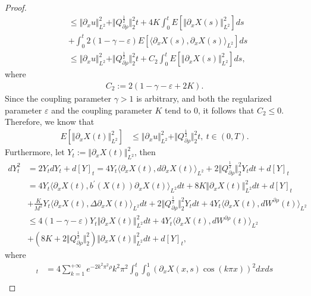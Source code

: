\documentclass[11pt]{article}
\numberwithin{equation}{section}%
\numberwithin{figure}{section}%
\theoremstyle{remark}
\begin{document}
\begin{proof}
\begin{align*}
			&\leq \Vert\partial_{x} u\Vert _{L^{2}}^{2}+\Vert Q_{\partial\rho}^{\frac{1}{2}}\Vert^{2}_{2}t+4K\int_{0}^{t}E[\Vert\partial_{x} X(s)\Vert _{L^{2}}^{2}]ds\\
			&+\int_{0}^{t}2(1-\gamma -\varepsilon)E[\langle \partial_{x} X(s), \partial_{x} X(s)\rangle_{L^{2}}]ds\\
			&\leq \Vert\partial_{x} u\Vert _{L^{2}}^{2}+\Vert Q_{\partial\rho}^{\frac{1}{2}}\Vert^{2}_{2}t+C_{2}\int_{0}^{t}E[\Vert\partial_{x} X(s)\Vert _{L^{2}}^{2}]ds,
		\end{align*}
		where
		\begin{align*}
			C_{2}:=2(1-\gamma -\varepsilon+2K).
		\end{align*}
	Since the coupling parameter $\gamma>1$ is arbitrary, and both the regularized parameter $\varepsilon$ and the coupling parameter $K$ tend to 0, it follows that $C_{2}\leq 0$. Therefore, we know that
		\begin{align*}
			E[\Vert\partial_{x} X(t)\Vert _{L^{2}}^{2}]
			&\leq \Vert\partial_{x} u\Vert _{L^{2}}^{2}+\Vert Q_{\partial\rho}^{\frac{1}{2}}\Vert^{2}_{2}t, \ t\in(0,T).
		\end{align*}
		Furthermore, let $Y_{t}:=\Vert\partial_{x} X(t)\Vert _{L^{2}}^{2}$, then
		\begin{align*}
			dY_{t}^{2}&=2 Y_{t} dY_{t}+d[Y]_{t}=4Y_{t}\langle \partial_{x}X(t), d\partial_{x} X(t)\rangle_{L^{2}}+2\Vert Q_{\partial\rho}^{\frac{1}{2}}\Vert^{2}_{2}Y_{t}dt+d[Y]_{t}\\
			&=4Y_{t}\langle \partial_{x} X(t), b^{\prime}(X(t))\partial_{x} X(t)\rangle_{L^{2}}dt+8K\Vert \partial_{x} X(t)\Vert _{L^{2}}^{2}dt+d[Y]_{t}\\
			&+\frac{K}{M^{2}}Y_{t}\langle \partial_{x} X(t), \Delta \partial_{x} X(t)\rangle_{L^{2}}dt+2\Vert Q_{\partial\rho}^{\frac{1}{2}}\Vert^{2}_{2}Y_{t}dt+4Y_{t}\langle\partial_{x} X(t), dW^{\partial\rho}(t)\rangle_{L^{2}}\\
			&\leq 4\left(1-\gamma -\varepsilon\right)Y_{t}\Vert\partial_{x} X(t)\Vert _{L^{2}}^{2}dt+4Y_{t}\langle \partial_{x} X(t), dW^{\partial\rho}(t)\rangle_{L^{2}}\\
			&+\left(8K+2\Vert Q_{\partial\rho}^{\frac{1}{2}}\Vert^{2}_{2}\right)\Vert \partial_{x} X(t)\Vert _{L^{2}}^{2}dt+d[Y]_{t}, 
		\end{align*}
		where
		\begin{align*}
			[Y]_{t}
			&=4\sum_{k=1}^{+\infty}e^{-2k^{2}\pi^{2}\rho}k^{2}\pi^{2}\int_{0}^{t}\int_{0}^{1}\left(\partial_{x} X(x,s) \cos(k\pi x)\right)^{2}dxds\\

\end{align*}
\end{proof}
\end{document}
